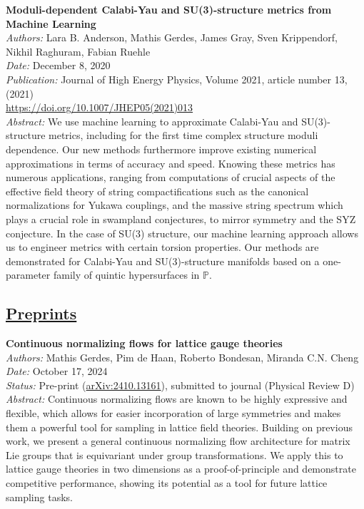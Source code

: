 \documentclass[11pt]{article}
\begin{document}
\textbf{Moduli-dependent Calabi-Yau and SU(3)-structure metrics from Machine Learning}\\
\textit{Authors:} Lara B. Anderson, Mathis Gerdes, James Gray, Sven Krippendorf, Nikhil Raghuram, Fabian Ruehle\\
\textit{Date:} December 8, 2020 \\
\textit{Publication:} Journal of High Energy Physics, Volume 2021, article number 13, (2021) \\
\href{https://doi.org/10.1007/JHEP05(2021)013}{https://doi.org/10.1007/JHEP05(2021)013}\\
\textit{Abstract:} We use machine learning to approximate Calabi-Yau and SU(3)-structure metrics, including for the first time complex structure moduli dependence. Our new methods furthermore improve existing numerical approximations in terms of accuracy and speed. Knowing these metrics has numerous applications, ranging from computations of crucial aspects of the effective field theory of string compactifications such as the canonical normalizations for Yukawa couplings, and the massive string spectrum which plays a crucial role in swampland conjectures, to mirror symmetry and the SYZ conjecture. In the case of SU(3) structure, our machine learning approach allows us to engineer metrics with certain torsion properties. Our methods are demonstrated for Calabi-Yau and SU(3)-structure manifolds based on a one-parameter family of quintic hypersurfaces in $\mathbb{P}$.

\subsection*{\underline{Preprints}}


\textbf{Continuous normalizing flows for lattice gauge theories}\\
\textit{Authors:} Mathis Gerdes, Pim de Haan, Roberto Bondesan, Miranda C.N. Cheng\\
\textit{Date:} October 17, 2024\\
\textit{Status:} Pre-print (\href{https://arxiv.org/abs/2410.13161}{arXiv:2410.13161}), submitted to journal (Physical Review D)\\
\textit{Abstract:} Continuous normalizing flows are known to be highly expressive and flexible, which allows for easier incorporation of large symmetries and makes them a powerful tool for sampling in lattice field theories. Building on previous work, we present a general continuous normalizing flow architecture for matrix Lie groups that is equivariant under group transformations. We apply this to lattice gauge theories in two dimensions as a proof-of-principle and demonstrate competitive performance, showing its potential as a tool for future lattice sampling tasks.
\end{document}
